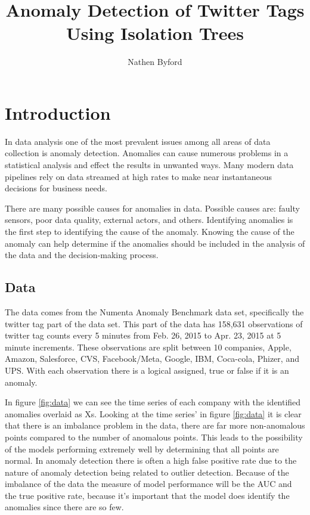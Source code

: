 \documentclass{article}
\title{Anomaly Detection of Twitter Tags Using Isolation Trees}
\author{Nathen Byford}
\date{}
\begin{document}
\maketitle

\tableofcontents

\newpage 

\section{Introduction}
In data analysis one of the most prevalent issues among all areas of data collection is anomaly detection. Anomalies can cause numerous problems in a statistical analysis and effect the results in unwanted ways. Many modern data pipelines rely on data streamed at high rates to make near instantaneous decisions for business needs. 

There are many possible causes for anomalies in data. Possible causes are: faulty sensors, poor data quality, external actors, and others. Identifying anomalies is the first step to identifying the cause of the anomaly. Knowing the cause of the anomaly can help determine if the anomalies should be included in the analysis of the data and the decision-making process.

\subsection{Data}
The data comes from the Numenta Anomaly Benchmark data set, specifically the twitter tag part of the data set. This part of the data has 158,631 observations of twitter tag counts every 5 minutes from Feb. 26, 2015 to Apr. 23, 2015 at 5 minute increments. These observations are split between 10 companies, Apple, Amazon, Salesforce, CVS, Facebook/Meta, Google, IBM, Coca-cola, Phizer, and UPS. With each observation there is a logical assigned, true or false if it is an anomaly.

In figure \ref{fig:data} we can see the time series of each company with the identified anomalies overlaid as Xs. Looking at the time series' in figure \ref*{fig:data} it is clear that there is an imbalance problem in the data, there are far more non-anomalous points compared to the number of anomalous points. This leads to the possibility of the models performing extremely well by determining that all points are normal. In anomaly detection there is often a high false positive rate due to the nature of anomaly detection  being related to outlier detection. Because of the imbalance of the data the measure of model performance will be the AUC and the true positive rate, because it's important that the model does identify the anomalies since there are so few.
\end{document}

